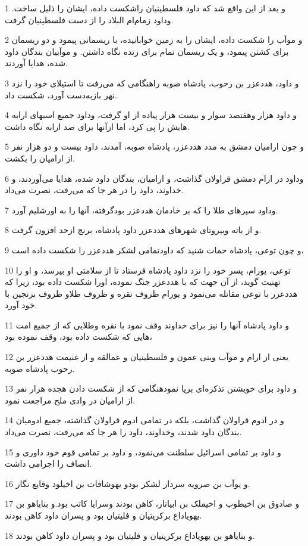 \par 1 و بعد از این واقع شد که داود فلسطینیان راشکست داده، ایشان را ذلیل ساخت. وداود زمام‌ام البلاد را از دست فلسطینیان گرفت.
\par 2 و موآب را شکست داده، ایشان را به زمین خوابانیده، با ریسمانی پیمود و دو ریسمان برای کشتن پیمود، و یک ریسمان تمام برای زنده نگاه داشتن. و موآبیان بندگان داود شده، هدایا آوردند.
\par 3 و داود، هددعزر بن رحوب، پادشاه صوبه راهنگامی که می‌رفت تا استیلای خود را نزد نهر بازبه‌دست آورد، شکست داد.
\par 4 و داود هزار وهفتصد سوار و بیست هزار پیاده از او گرفت، وداود جمیع اسبهای ارابه هایش را پی کرد، اما ازآنها برای صد ارابه نگاه داشت.
\par 5 و چون ارامیان دمشق به مدد هددعزر، پادشاه صوبه، آمدند، داود بیست و دو هزار نفر از ارامیان را بکشت.
\par 6 وداود در ارام دمشق قراولان گذاشت، و ارامیان، بندگان داود شده، هدایا می‌آوردند، و خداوند، داود را در هر جا که می‌رفت، نصرت می‌داد.
\par 7 وداود سپرهای طلا را که بر خادمان هددعزر بودگرفته، آنها را به اورشلیم آورد.
\par 8 و از باته وبیروتای شهرهای هددعزر داود پادشاه، برنج ازحد افزون گرفت.
\par 9 و چون توعی، پادشاه حمات شنید که داودتمامی لشکر هددعزر را شکست داده است،
\par 10 توعی، یورام، پسر خود را نزد داود پادشاه فرستاد تا از سلامتی او بپرسد، و او را تهنیت گوید، از آن جهت که با هددعزر جنگ نموده، اورا شکست داده بود، زیرا که هددعزر با توعی مقاتله می‌نمود و یورام ظروف نقره و ظروف طلاو ظروف برنجین با خود آورد.
\par 11 و داود پادشاه آنها را نیز برای خداوند وقف نمود با نقره وطلایی که از جمیع امت هایی که شکست داده بود، وقف نموده بود،
\par 12 یعنی از ارام و موآب وبنی عمون و فلسطینیان و عمالقه و از غنیمت هددعزر بن رحوب پادشاه صوبه.
\par 13 و داود برای خویشتن تذکره‌ای برپا نمودهنگامی که از شکست دادن هجده هزار نفر از ارامیان در وادی ملح مراجعت نمود.
\par 14 و در ادوم قراولان گذاشت، بلکه در تمامی ادوم قراولان گذاشته، جمیع ادومیان بندگان داود شدند، وخداوند، داود را هر جا که می‌رفت، نصرت می‌داد.
\par 15 و داود بر تمامی اسرائیل سلطنت می‌نمود، و داود بر تمامی قوم خود داوری و انصاف را اجرامی داشت.
\par 16 و یوآب بن صرویه سردار لشکر بودو یهوشافات بن اخیلود وقایع نگار.
\par 17 و صادوق بن اخیطوب و اخیملک بن ابیاتار، کاهن بودند وسرایا کاتب بود.و بنایاهو بن یهویاداع برکریتیان و فلیتیان بود و پسران داود کاهن بودند.
\par 18 و بنایاهو بن یهویاداع برکریتیان و فلیتیان بود و پسران داود کاهن بودند.
 
